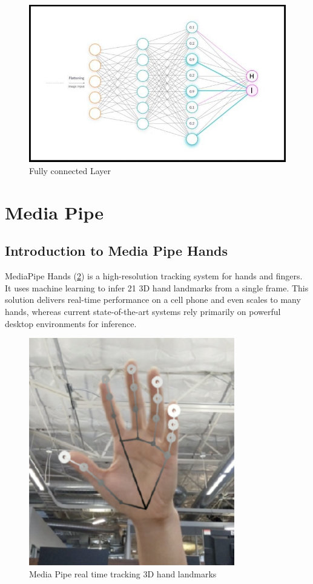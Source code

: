         \begin{figure}[H]
          \centering
          \includegraphics[width=\textwidth]{img/Chap3/FC}
          \caption{ Fully connected Layer}
          \label{fig:Chap3-FC}
        \end{figure}
  \section{ Media Pipe }
    \subsection{Introduction to Media Pipe Hands}
        MediaPipe Hands (\ref{fig:Chap3-MediaPipe}) is a high-resolution tracking system for hands and fingers. It uses machine learning to infer 21 3D hand landmarks from a single frame. This solution delivers real-time performance on a cell phone and even scales to many hands, whereas current state-of-the-art systems rely primarily on powerful desktop environments for inference.

        \begin{figure}[H]
          \centering
          \includegraphics[width=0.8\textwidth]{img/Chap3/Media Pipe}
          \caption{ Media Pipe real time tracking 3D hand landmarks}
          \label{fig:Chap3-MediaPipe}
        \end{figure}

